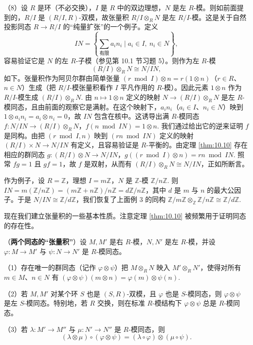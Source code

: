\begin{example}
（8）设 \(R\) 是环（不必交换），\(I\) 是 \(R\) 中的双边理想，\(N\) 是左 \(R\)-模。则如前面提到的，\(R/I\) 是 \((R/I, R)\)-双模，故张量积 \(R/I \otimes_R N\) 是左 \(R/I\)-模。这是关于自然投影同态 \(R \to R/I\) 的“纯量扩张”的一个例子。定义
\[
IN = \left\{\sum_{\text{有限}} a_in_i \mid a_i \in I,\ n_i \in N\right\},
\]
容易验证它是 \(N\) 的左 \(R\)-子模（参见第 10.1 节习题 5）。则作为左 \(R\)-模
\[
(R/I) \otimes_R N \cong N/IN,
\]
如下。张量积作为阿贝尔群由简单张量 \((r \bmod I) \otimes n = r(1 \otimes n)\)（\(r \in R\)、\(n \in N\)）生成（把 \(R/I\)-模张量积看作 \(I\) 平凡作用的 \(R\)-模）。因此元素 \(1 \otimes n\) 作为 \(R/I\)-模生成 \((R/I) \otimes_R N\). 由 \(n \mapsto 1 \otimes n\) 定义的映射 \(N \to (R/I) \otimes_R N\) 是左 \(R\)-模同态，且由前面的观察它是满射。在这个映射下，\(a_in_i\)（\(a_i \in I\)、\(n_i \in N\)）映到 \(1 \otimes a_in_i = a_i \otimes n_i = 0\)，故 \(IN\) 包含在核中。这诱导出满 \(R\)-模同态 \(f : N/IN \to (R/I) \otimes_R N\)，\(f(n \bmod IN) = 1 \otimes n\). 我们通过给出它的逆来证明 \(f\) 是同构。由把 \((r \bmod I, n)\) 映到 \((rn \bmod IN)\) 定义的映射 \((R/I) \times N \to N/IN\) 有定义，且容易验证是 \(R\)-平衡的。由定理 \ref{thm:10.10} 存在相应的群同态 \(g : (R/I) \otimes N \to N/IN\)，\(g((r \bmod I) \otimes n) = rn \bmod IN\). 照常 \(fg = 1\) 且 \(gf = 1\)，故 \(f\) 是双射，从而有 \((R/I) \otimes_R N \cong N/IN\)，正如所断言。

作为例子，设 \(R = \mathbb{Z}\)，理想 \(I = m\mathbb{Z}\)，\(N\) 是 \(\mathbb{Z}\)-模 \(\mathbb{Z}/n\mathbb{Z}\). 则 \(IN = m(\mathbb{Z}/n\mathbb{Z}) = (m\mathbb{Z}+n\mathbb{Z})/n\mathbb{Z} = d\mathbb{Z}/n\mathbb{Z}\)，其中 \(d\) 是 \(m\) 与 \(n\) 的最大公因子。于是 \(N/IN \cong \mathbb{Z}/d\mathbb{Z}\)，我们恢复了上面例 3 的同构 \(\mathbb{Z}/m\mathbb{Z} \otimes_{\mathbb{Z}} \mathbb{Z}/n\mathbb{Z} \cong \mathbb{Z}/d\mathbb{Z}\).
\end{example}

现在我们建立张量积的一些基本性质。注意定理 \ref{thm:10.10} 被频繁用于证明同态的存在性。

\begin{theorem}\label{thm:10.13}
（\textbf{两个同态的“张量积”}）设 \(M, M'\) 是右 \(R\)-模，\(N, N'\) 是左 \(R\)-模，并设 \(\varphi : M \to M'\) 与 \(\psi : N \to N'\) 是 \(R\)-模同态。

（1）存在唯一的群同态（记作 \(\varphi \otimes \psi\)）把 \(M \otimes_R N\) 映入 \(M' \otimes_R N'\)，使得对所有 \(m \in M\)、\(n \in N\) 有 \((\varphi \otimes \psi)(m \otimes n) = \varphi(m) \otimes \psi(n)\).

（2）若 \(M, M'\) 对某个环 \(S\) 也是 \((S, R)\)-双模，且 \(\varphi\) 也是 \(S\)-模同态，则 \(\varphi \otimes \psi\) 是左 \(S\)-模同态。特别地，若 \(R\) 交换，则在标准 \(R\)-模结构下 \(\varphi \otimes \psi\) 总是 \(R\)-模同态。

（3）若 \(\lambda : M' \to M''\) 与 \(\mu : N' \to N''\) 是 \(R\)-模同态，则
\[
(\lambda \otimes \mu) \circ (\varphi \otimes \psi) = (\lambda \circ \varphi) \otimes (\mu \circ \psi).
\]
\end{theorem}

